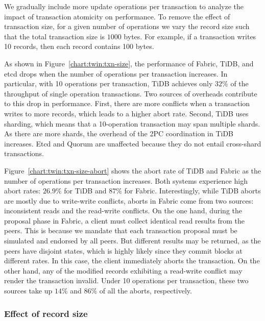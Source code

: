 We gradually include more update operations per transaction to analyze the
impact of transaction atomicity on performance. 
To remove the effect of transaction size, for a given number of operations we
vary the record size such that the total transaction size is $1000$ bytes. 
For example, if a transaction writes 10 records, then each record contains
100 bytes.

As shown in Figure~\ref{chart:twin:txn-size}, the performance of Fabric, TiDB, and etcd
drops when the number of operations per transaction increases.
In particular, with 10 operations per transaction, TiDB achieves only $32\%$ of
the throughput of single operation transactions.
Two sources of overheads contribute to this drop in performance.
First, there are more conflicts when a transaction writes to more records, which
leads to a higher abort rate.
Second, TiDB uses sharding, which means that a 10-operation transaction may span
multiple shards.
As there are more shards, the overhead of the 2PC coordination in TiDB
increases.
Etcd and Quorum are unaffected because they do not entail cross-shard
transactions.

Figure~\ref{chart:twin:txn-size-abort} shows the abort rate of TiDB and Fabric as the
number of operations per transaction increases.
Both systems experience high abort rates: $26.9\%$ for TiDB and $87\%$ for
Fabric.
Interestingly, while TiDB aborts are mostly due to write-write conflicts, aborts
in Fabric come from two sources: inconsistent reads and the read-write
conflicts.
On the one hand, during the proposal phase in Fabric, a client must collect
identical read results from the peers.
This is because we mandate that each transaction proposal must be simulated and
endorsed by all peers.
But different results may be returned, as the peers have disjoint states, which
is highly likely since they commit blocks at different rates.
In this case, the client immediately aborts the transaction.
On the other hand, any of the modified records exhibiting a read-write conflict
may render the transaction invalid.
Under 10 operations per transaction, these two sources take up $14\%$ and $86\%$
of all the aborts, respectively.

\subsubsection{Effect of record size}
\label{sec:twin:exp:txn:record_size}

